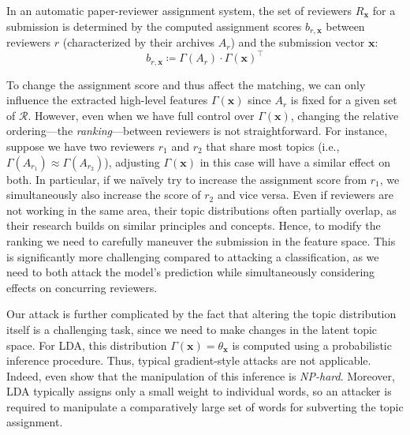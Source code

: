 \documentclass[letterpaper,twocolumn,10pt]{article}
\newcommand{\bow}{\textbf{x}}
\newcommand{\submission}{\bow}
\newcommand{\reviewersset}{\mathcal{R}}
\newcommand{\reviewersubset}{R}
\newcommand{\reviewer}{r}
\newcommand{\archive}{A}
\newcommand{\bid}{b}
\newcommand{\topicextractor}{\Gamma}
\newcommand{\topicdocumentdist}{\theta}
\begin{document}
In an automatic paper-reviewer assignment system, the set of reviewers $\reviewersubset_\submission$ for a submission is determined by the computed assignment scores $\bid_{\reviewer, \submission}$ between reviewers $\reviewer$ (characterized by their archives $\archive_\reviewer$) and the submission vector $\submission$: 
\begin{equation}
    \label{eq:score}
    \bid_{\reviewer, \submission}  \coloneqq \topicextractor(\archive_\reviewer) \cdot \topicextractor(\submission)^\top
\end{equation}

To change the assignment score and thus affect the matching, we can only influence the extracted high-level features $\topicextractor(\submission)$ since $\archive_r$ is fixed for a given set of $\reviewersset$. However, even when we have full control over $\topicextractor(\submission)$, changing the relative ordering---the \emph{ranking}---between reviewers is not straightforward. For instance, suppose we have two reviewers $\reviewer_1$ and $\reviewer_2$ that share most topics (i.e., $\topicextractor(\archive_{\reviewer_1}) \approx \topicextractor(\archive_{\reviewer_2})$), adjusting $\topicextractor(\submission)$ in this case will have a similar effect on both.
In particular, if we na\"ively  try to increase the assignment score from $\reviewer_1$, we simultaneously also increase the score of $\reviewer_2$ and vice versa. Even if reviewers are not working in the same area, their topic distributions often partially overlap, as their research builds on similar principles and concepts. Hence, to modify the ranking we need to carefully maneuver the submission in the feature space.
This is significantly more challenging compared to attacking a classification, as we need to both attack the model's prediction while simultaneously considering effects on concurring reviewers.

Our attack is further complicated by the fact that altering the topic distribution itself is a challenging task, since we need to make changes in the latent topic space. For \ac{LDA}, this distribution $\topicextractor(\submission) = \topicdocumentdist_\submission$ is computed using a probabilistic inference procedure. Thus, typical gradient-style attacks are not applicable. Indeed, \citet{zhou-20-evalda} even show that the manipulation of this inference is \emph{NP-hard}. Moreover, \ac{LDA} typically assigns only a small weight to individual words, so an attacker is required to manipulate a comparatively large set of words for subverting the topic assignment.
\end{document}
